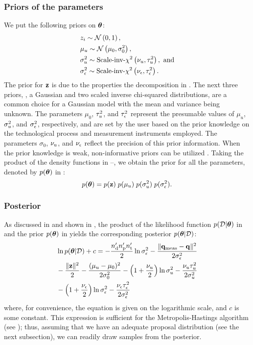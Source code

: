 \subsubsection{Priors of the parameters}
We put the following priors on ${\boldsymbol\theta}$:
\begin{align}
  & \z_i \sim \gaussian{0}{1}, \elabel{z-prior} \\
  & \mu_\u \sim \gaussian{\mu_0}{\sigma^2_0}, \elabel{mu-u-prior} \\
  & \sigma^2_\u \sim \sichisquared{\nu_\u}{\tau^2_\u}, \text{ and} \elabel{sigma2-u-prior} \\
  & \sigma^2_\noise \sim \sichisquared{\nu_\noise}{\tau^2_\noise}. \elabel{sigma2-noise-prior}
\end{align}
The prior for $\mathbf{z}$ is due to the properties the decomposition in .
The next three priors, \ie, a Gaussian and two scaled inverse chi-squared distributions, are a common choice for a Gaussian model with the mean and variance being unknown.
The parameters $\mu_0$, $\tau^2_u$, and $\tau^2_\epsilon$ represent the presumable values of $\mu_u$, $\sigma^2_u$, and $\sigma^2_\epsilon$, respectively, and are set by the user based on the prior knowledge on the technological process and measurement instruments employed. The parameters $\sigma_0$, $\nu_u$, and $\nu_\epsilon$ reflect the precision of this prior information.
When the prior knowledge is weak, non-informative priors can be utilized \cite{gelman2004, bernardo2007}.
Taking the product of the density functions in --, we obtain the prior for all the parameters, denoted by $\f{\vparam}$ in :
\begin{equation} \elabel{prior}
  \f{\vparam} = \f{\vz} \; \f{\mu_\u} \; \f{\sigma^2_\u} \; \f{\sigma^2_\noise}.
\end{equation}

\subsubsection{Posterior}
As discussed in  and shown in , the product of the likelihood function $\f{\Data | \vparam}$ in  and the prior $\f{\vparam}$ in  yields the corresponding posterior $\f{\vparam | \Data}$:
\begin{align}
  & \ln \f{\vparam | \Data} + c = -\frac{\nrdies \nrprocs \nrsteps}{2} \ln \sigma^2_\noise - \frac{\norm{\mvT_\meas - \mvT}^2}{2 \sigma^2_\noise} \nonumber \\
  & {} - \frac{\norm{\vz}^2}{2} - \frac{(\mu_\u - \mu_0)^2}{2 \sigma^2_0} - \left(1 + \frac{\nu_\u}{2}\right) \ln \sigma^2_\u - \frac{\nu_\u \tau_\u^2}{2 \sigma^2_\u} \nonumber \\
  & {} - \left(1 + \frac{\nu_\noise}{2}\right) \ln \sigma^2_\noise - \frac{\nu_\noise \tau_\noise^2}{2 \sigma^2_\noise} \elabel{log-posterior}
\end{align}
where, for convenience, the equation is given on the logarithmic scale, and $c$ is some constant. This expression is sufficient for the Metropolis-Hastings algorithm (see ); thus, assuming that we have an adequate proposal distribution (see the next subsection), we can readily draw samples from the posterior.
